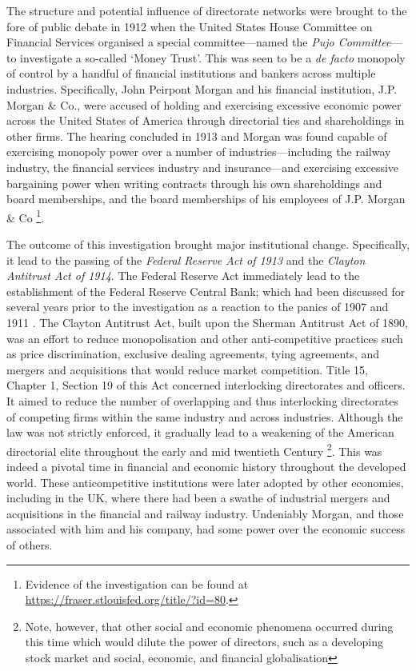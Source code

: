 The structure and potential influence of directorate networks were brought to the fore of public debate in 1912 when the United States House Committee on Financial Services organised a special committee---named the \emph{Pujo Committee}---to investigate a so-called `Money Trust'. This was seen to be a \emph{de facto} monopoly of control by a handful of financial institutions and bankers across multiple industries. Specifically, John Peirpont Morgan and his financial institution, J.P. Morgan \& Co., were accused of holding and exercising excessive economic power across the United States of America through directorial ties and shareholdings in other firms. The hearing concluded in 1913 and Morgan was found capable of exercising monopoly power over a number of industries---including the railway industry, the financial services industry and insurance---and exercising excessive bargaining power when writing contracts through his own shareholdings and board memberships, and the board memberships of his employees of J.P. Morgan \& Co \footnote{Evidence of the investigation can be found at \href{https://fraser.stlouisfed.org/title/?id=80}{https://fraser.stlouisfed.org/title/?id=80}.}.

The outcome of this investigation brought major institutional change. Specifically, it lead to the passing of the \emph{Federal Reserve Act of 1913} and the \emph{Clayton Antitrust Act of 1914}. The Federal Reserve Act immediately lead to the establishment of the Federal Reserve Central Bank; which had been discussed for several years prior to the investigation as a reaction to the panics of 1907 and 1911 \citep{Silber2007}. The Clayton Antitrust Act, built upon the Sherman Antitrust Act of 1890, was an effort to reduce monopolisation and other anti-competitive practices such as price discrimination, exclusive dealing agreements, tying agreements, and mergers and acquisitions that would reduce market competition. Title 15, Chapter 1, Section 19 of this Act concerned interlocking directorates and officers. It aimed to reduce the number of overlapping and thus interlocking directorates of competing firms within the same industry and across industries. Although the law was not strictly enforced, it gradually lead to a weakening of the American directorial elite throughout the early and mid twentieth Century \footnote{Note, however, that other social and economic phenomena occurred during this time which would dilute the power of directors, such as a developing stock market and social, economic, and financial globalisation}. This was indeed a pivotal time in financial and economic history throughout the developed world. These anticompetitive institutions were later adopted by other economies, including in the UK, where there had been a swathe of industrial mergers and acquisitions in the financial and railway industry. Undeniably Morgan, and those associated with him and his company, had some power over the economic success of others.

